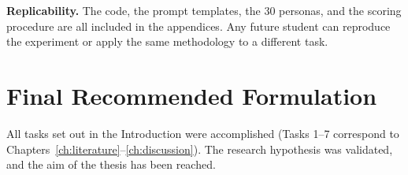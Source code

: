 \textbf{Replicability.} The code, the prompt templates, the 30 personas, and the scoring procedure are all included in the appendices. Any future student can reproduce the experiment or apply the same methodology to a different task.

\section*{Final Recommended Formulation}

All tasks set out in the Introduction were accomplished (Tasks 1--7 correspond to Chapters~\ref{ch:literature}--\ref{ch:discussion}). The research hypothesis was validated, and the aim of the thesis has been reached.
